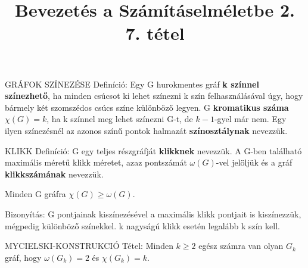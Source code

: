 \documentclass[]{article}
\title{Bevezetés a Számításelméletbe 2.\\{\large 7. tétel}}
\begin{document}
\maketitle
\begin{shaded}
GRÁFOK SZÍNEZÉSE Definíció: Egy G hurokmentes gráf \textbf{k színnel színezhető}, ha minden csúcsot ki lehet színezni k szín felhasználásával úgy, hogy bármely két szomszédos csúcs színe különböző legyen. G \textbf{kromatikus száma} $\chi(G) = k$, ha k színnel meg lehet színezni G-t, de $k - 1$-gyel már nem. Egy ilyen színezésnél az azonos színű pontok halmazát \textbf{színosztálynak} nevezzük.
\end{shaded}
\begin{shaded}
KLIKK Definíció: G egy teljes részgráfját \textbf{klikknek} nevezzük. A G-ben található maximális méretű klikk méretet, azaz pontszámát $\omega(G)$-vel jelöljük és a gráf \textbf{klikkszámának} nevezzük.
\end{shaded}
\begin{framed}
Minden G gráfra $\chi(G) \geq \omega(G)$.
\end{framed}
\begin{leftbar}
Bizonyítás: G pontjainak kiszínezésével a maximális klikk pontjait is kiszínezzük, mégpedig különböző színekkel. k nagyságú klikk esetén legalább k szín kell.
\end{leftbar}
\begin{framed}
MYCIELSKI-KONSTRUKCIÓ Tétel: Minden $k \geq 2$ egész számra van olyan $G_k$ gráf, hogy $\omega(G_k) = 2$ és $\chi(G_k) = k$.
\end{framed}
\end{document}
